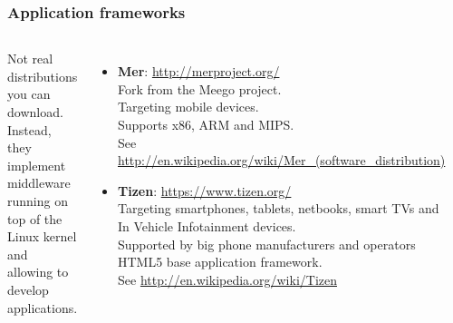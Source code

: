 \begin{frame}
  \frametitle{Application frameworks}
  \small
  \begin{columns}
    Not real distributions you can download. Instead, they
    implement middleware running on top of the Linux kernel
    and allowing to develop applications.
    \begin{itemize}
    \item {\bf Mer}: \url{http://merproject.org/}\\
      Fork from the Meego project.\\
      Targeting mobile devices.\\
      Supports x86, ARM and MIPS. \\
      See \url{http://en.wikipedia.org/wiki/Mer\_(software\_distribution)}
    \item {\bf Tizen}: \url{https://www.tizen.org/} \\
      Targeting smartphones, tablets, netbooks, smart TVs and
      In Vehicle Infotainment devices.\\
      Supported by big phone manufacturers and operators \\
      HTML5 base application framework. \\
      See \url{http://en.wikipedia.org/wiki/Tizen}
    \end{itemize}
    \includegraphics[width=\textwidth]{slides/sysdev-embedded-linux/mer.png}\\

\end{columns}
\end{frame}
